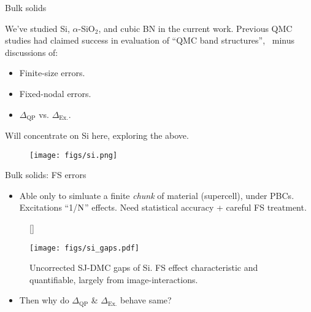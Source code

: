 \documentclass[10pt, pdf, hyperref={draft}, usenames, dvipsnames]{beamer}
\begin{document}

\begin{frame}{Bulk solids}

We've studied Si, $\alpha$-SiO$_2$, and cubic BN in the current work. Previous
QMC studies had claimed success in evaluation of ``QMC band
structures'',~
minus discussions of:

\begin{minipage}[t]{0.35\textwidth}
\vspace{0.3cm}
\begin{itemize}
  \item Finite-size errors.
  \item Fixed-nodal errors.
  \item $\Delta_{\text{QP}}$ vs. $\Delta_{\text{Ex.}}$.
\end{itemize}
\vspace{0.3cm}
Will concentrate on Si here, exploring the above.
\end{minipage}%
\hfill
\begin{minipage}[t]{0.55\textwidth}
\begin{figure}[H]
  \centering
  \texttt{[image: figs/si.png]}
\label{fig:silicon}
\end{figure}
\end{minipage}%
\end{frame}

\begin{frame}{Bulk solids: FS errors}
\begin{itemize}
  \item Able only to simluate a finite \textit{chunk} of material
  (supercell), under PBCs. Excitations ``1/${\rm N}$'' effects. Need statistical
  accuracy + careful FS treatment.
\end{itemize}
\begin{figure}[H]
  [\FBwidth]
  {\caption{Uncorrected SJ-DMC gaps of Si. FS effect characteristic and
  quantifiable, largely from image-interactions.}\label{fig:si_gaps}}
  {\texttt{[image: figs/si\_gaps.pdf]}}
\end{figure}
\begin{itemize}
  \item Then why do $\Delta_{\text{QP}}$ \& $\Delta_{\text{Ex.}}$ behave same?
\end{itemize}
\end{frame}
\end{document}
